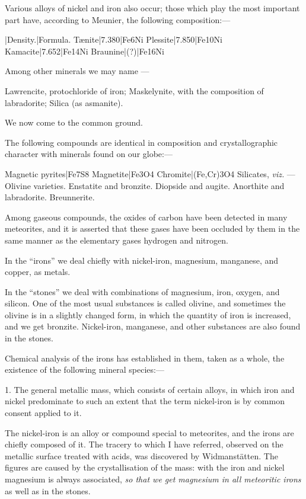 \documentclass[a4paper, 12pt, oneside, polutonikogreek, english]{article}
\begin{document}
Various alloys of nickel and iron also occur; those which play the most important part have, according to Meunier, the following composition:---

|Density.|Formula. 
Tænite|7.380|Fe6Ni 
Plessite|7.850|Fe10Ni 
Kamacite|7.652|Fe14Ni 
Braunine|(?)|Fe16Ni 

Among other minerals we may name ---

Lawrencite, protochloride of iron; 
Maskelynite, with the composition of labradorite; 
Silica (as asmanite).

We now come to the common ground.

The following compounds are identical in composition and crystallographic character with minerals found on our globe:---

Magnetic pyrites|Fe7S8 
Magnetite|Fe3O4 
Chromite|(Fe,Cr)3O4 
Silicates, \emph{viz.} --- 
Olivine varieties. 
Enstatite and bronzite. 
Diopside and augite. 
Anorthite and labradorite. 
Breunnerite.

Among gaseous compounds, the oxides of carbon have been detected in many meteorites, and it is asserted that these gases have been occluded by them in the same manner as the elementary gases hydrogen and nitrogen.

In the ``irons'' we deal chiefly with nickel-iron, magnesium, manganese, and copper, as metals.

In the ``stones'' we deal with combinations of magnesium, iron, oxygen, and silicon. One of the most usual substances is called olivine, and sometimes the olivine is in a slightly changed form, in which the quantity of iron is increased, and we get bronzite. Nickel-iron, manganese, and other substances are also found in the stones.

Chemical analysis of the irons has established in them, taken as a whole, the existence of the following mineral species:---

1. The general metallic mass, which consists of certain alloys, in which iron and nickel predominate to such an extent that the term nickel-iron is by common consent applied to it.

The nickel-iron is an alloy or compound special to meteorites, and the irons are chiefly composed of it. The tracery to which I have referred, observed on the metallic surface treated with acids, was discovered by Widmanstätten. The figures are caused by the crystallisation of the mass: with the iron and nickel magnesium is always associated, \emph{so that we get magnesium in all meteoritic irons} as well as in the stones.
\end{document}
